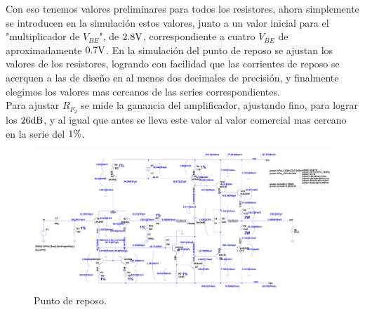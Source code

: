 Con eso tenemos valores preliminares para todos los resistores, ahora simplemente se introducen en la simulación estos valores, junto a un valor inicial para el "multiplicador de $V_{BE}$", de $2.8 \si[per-mode=symbol]{\volt}$, correspondiente a cuatro $V_{BE}$ de aproximadamente $0.7 \si[per-mode=symbol]{\volt}$. En la simulación del punto de reposo se ajustan los valores de los resistores, logrando con facilidad que las corrientes de reposo se acerquen a las de diseño en al menos dos decimales de precisión, y finalmente elegimos los valores mas cercanos de las series correspondientes. \\
Para ajustar $R_{F_{2}}$ se mide la ganancia del amplificador, ajustando fino, para lograr los $26 \si[per-mode=symbol]{\decibel}$, y al igual que antes se lleva este valor al valor comercial mas cercano en la serie del $1 \si[per-mode=symbol]{\percent}$.




\vfill




\clearpage

\begin{figure}[H] %
\begin{center}
\includegraphics[width=0.93 \textheight, angle=90]{./img/circuits/amplifier_qpoint.png}
\caption{\label{fig:fig_q_point}\footnotesize{Punto de reposo.}}
\end{center}
\end{figure}

\clearpage



 
